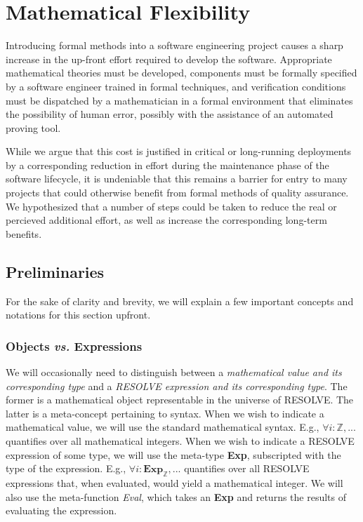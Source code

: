 


\chapter{Mathematical Flexibility\label{ch:math}}

Introducing formal methods into a software engineering project causes a sharp increase in the up-front effort required to develop the software.  Appropriate mathematical theories must be developed, components must be formally specified by a software engineer trained in formal techniques, and verification conditions must be dispatched by a mathematician in a formal environment that eliminates the possibility of human error, possibly with the assistance of an automated proving tool.

While we argue that this cost is justified in critical or long-running deployments by a corresponding reduction in effort during the maintenance phase of the software lifecycle, it is undeniable that this remains a barrier for entry to many projects that could otherwise benefit from formal methods of quality assurance.  We hypothesized that a number of steps could be taken to reduce the real or percieved additional effort, as well as increase the corresponding long-term benefits.


\section{Preliminaries\label{preliminaries}}

For the sake of clarity and brevity, we will explain a few important concepts and notations for this section upfront.

	\subsection{Objects \emph{vs.} Expressions\label{objectsVsExpressions}}

We will occasionally need to distinguish between a \emph{mathematical value and its corresponding type} and a \emph{RESOLVE expression and its corresponding type}.  The former is a mathematical object representable in the universe of RESOLVE.  The latter is a meta-concept pertaining to syntax.  When we wish to indicate a mathematical value, we will use the standard mathematical syntax.  E.g., $\forall i : \mathbb{Z}, ...$ quantifies over all mathematical integers.  When we wish to indicate a RESOLVE expression of some type, we will use the meta-type \textbf{Exp}, subscripted with the type of the expression.  E.g., $\forall i : \textbf{Exp}_\mathbb{Z}, ...$ quantifies over all RESOLVE expressions that, when evaluated, would yield a mathematical integer.  We will also use the meta-function \emph{Eval}, which takes an \textbf{Exp} and returns the results of evaluating the expression.

